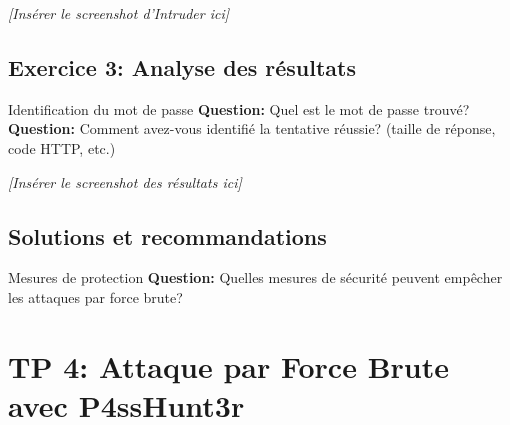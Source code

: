 \documentclass[12pt,a4paper]{article}
\begin{document}
\begin{answerbox}
\vspace{7cm}
\end{answerbox}

\begin{screenshotbox}
\centering
\textit{[Insérer le screenshot d'Intruder ici]}
\end{screenshotbox}

\subsection{Exercice 3: Analyse des résultats}

\begin{exercicebox}{Identification du mot de passe}
\textbf{Question:} Quel est le mot de passe trouvé?\\
\textbf{Question:} Comment avez-vous identifié la tentative réussie? (taille de réponse, code HTTP, etc.)
\end{exercicebox}

\begin{answerbox}
\vspace{7cm}
\end{answerbox}

\begin{screenshotbox}
\centering
\textit{[Insérer le screenshot des résultats ici]}
\end{screenshotbox}

\subsection{Solutions et recommandations}

\begin{exercicebox}{Mesures de protection}
\textbf{Question:} Quelles mesures de sécurité peuvent empêcher les attaques par force brute?
\end{exercicebox}

\begin{answerbox}
\vspace{7cm}
\end{answerbox}

\newpage

\section{TP 4: Attaque par Force Brute avec P4ssHunt3r}
\end{document}
